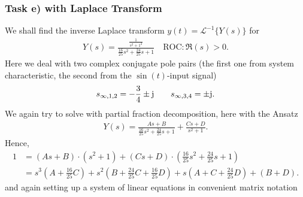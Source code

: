 \documentclass[11pt,a4paper,DIV=12]{scrartcl}
\begin{document}
\subsubsection{Task e) with Laplace Transform}
\label{sec:task_e_Laplace}
We shall find the inverse Laplace transform $y(t) = \mathcal{L}^{-1}\{Y(s)\}$
for
\begin{align}
Y(s) = \frac{\frac{1}{s^2 + 1^2}}{\frac{16}{25} s^2 + \frac{24}{25} s + 1}
\quad \text{ROC}: \Re(s) > 0.
\end{align}
Here we deal with two complex conjugate pole pairs (the first one from system
characteristic, the second from the $\sin(t)$-input signal)
\begin{align}
s_{\infty,1,2} = -\frac{3}{4} \pm \im \qquad s_{\infty,3,4} = \pm \im.
\end{align}
We again try to solve with partial fraction decomposition, here with the Ansatz
\begin{align}
Y(s) = \frac{A s + B}{\frac{16}{25} s^2 + \frac{24}{25} s + 1}+
\frac{C s + D}{s^2+1}.
\end{align}
Hence,
\begin{align}
1&=
(A s + B) \cdot (s^2+1)+
(C s + D) \cdot (\frac{16}{25} s^2 + \frac{24}{25} s + 1) \nonumber \\
&= s^3(A+\frac{16}{25}C)+s^2(B+\frac{24}{25}C+\frac{16}{25}D)+s(A+C+\frac{24}{25}D)+(B+D).
\end{align}
and again setting up a system of linear equations in convenient matrix notation
\end{document}
